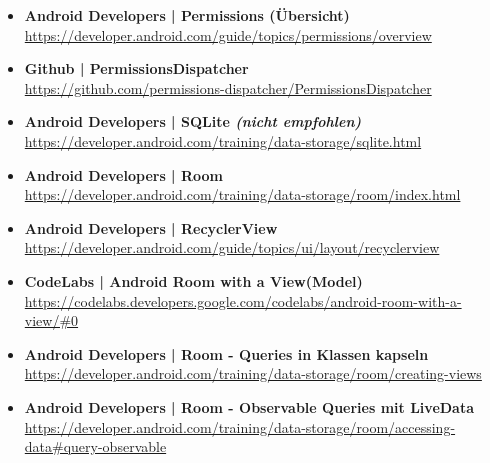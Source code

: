 \documentclass[a4paper]{article}
\begin{document}
	\begin{itemize}
		\item \textbf{Android Developers | Permissions (Übersicht)}\\
		\href{https://developer.android.com/guide/topics/permissions/overview}
		{https://developer.android.com/guide/topics/permissions/overview}
		
		\item \textbf{Github | PermissionsDispatcher}\\
		\href{https://github.com/permissions-dispatcher/PermissionsDispatcher}
		{https://github.com/permissions-dispatcher/PermissionsDispatcher}
		
		\item \textbf{Android Developers | SQLite \textit{(nicht empfohlen)}}\\
		\href{https://developer.android.com/training/data-storage/sqlite.html}
		{https://developer.android.com/training/data-storage/sqlite.html}
		
		\item \textbf{Android Developers | Room}\\
		\href{https://developer.android.com/training/data-storage/room/index.html}
		{https://developer.android.com/training/data-storage/room/index.html}
		
		\item \textbf{Android Developers | RecyclerView}\\
		\href{https://developer.android.com/guide/topics/ui/layout/recyclerview}
		{https://developer.android.com/guide/topics/ui/layout/recyclerview}
		
		\item \textbf{CodeLabs | Android Room with a View(Model)}\\
		\href{https://codelabs.developers.google.com/codelabs/android-room-with-a-view/#0}
		{https://codelabs.developers.google.com/codelabs/android-room-with-a-view/\#0}
		
		\item \textbf{Android Developers | Room - Queries in Klassen kapseln}\\
		\href{https://developer.android.com/training/data-storage/room/creating-views}
		{https://developer.android.com/training/data-storage/room/creating-views}
		
		\item \textbf{Android Developers | Room - Observable Queries mit LiveData}\\
		\href{https://developer.android.com/training/data-storage/room/accessing-data#query-observable}
		{https://developer.android.com/training/data-storage/room/accessing-data\#query-observable}
		

\end{itemize}
\end{document}
